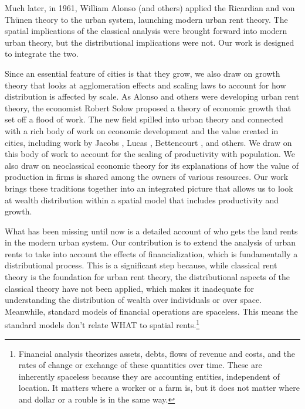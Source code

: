 Much later, in 1961, William Alonso (and others) \cite{alonsoModelUrbanLand1960} applied the Ricardian and von Th\"unen theory to the urban system, launching modern urban rent theory.  The spatial implications of the classical analysis were brought forward into modern urban theory, but the distributional implications were not. Our work is designed to integrate the two.

Since an essential feature of cities is that they grow, we also draw on growth theory that looks at agglomeration effects and scaling laws to account for how distribution is affected by scale.  As Alonso and others were developing urban rent theory, the economist Robert Solow \cite{solowContributionTheoryEconomic1956} proposed a theory of economic growth that set off a flood of work. The new field spilled into urban theory and connected with a rich body of work on economic development and the value created in cities, including work by Jacobs \cite{jacobsEconomyCities1969}, Lucas \cite{lucasMechanicsEconomicDevelopment1988}, Bettencourt \cite{bettencourtGrowthInnovationScaling2007}, and others. We draw on this body of work to account for the scaling of productivity with population. We also draw on neoclassical economic theory for its explanations of how the value of production in firms is shared among the owners of various resources. Our work brings these traditions together into an integrated picture that allows us to look at wealth distribution within a spatial model that includes productivity and growth.  

 What has been missing until now is a detailed account of who gets the land rents in the modern urban system. Our contribution is to extend the analysis of urban rents to take into account the effects of financialization, which is fundamentally a distributional process. This is a significant step because, while classical rent theory is the foundation for urban rent theory, the distributional aspects of the classical theory have not been applied, which makes it inadequate for understanding the distribution of wealth over individuals or over space. Meanwhile, standard models of financial operations are spaceless. {\color{red} This means the standard models don't relate WHAT to spatial rents.}\footnote{%
 Financial analysis theorizes assets, debts, flows of revenue and costs, and the rates of change or exchange of these quantities over time. These are inherently spaceless because they are accounting entities, independent of location. It matters where a worker or a farm is, but it does not matter where and dollar or a rouble is in the same way.} 
 
